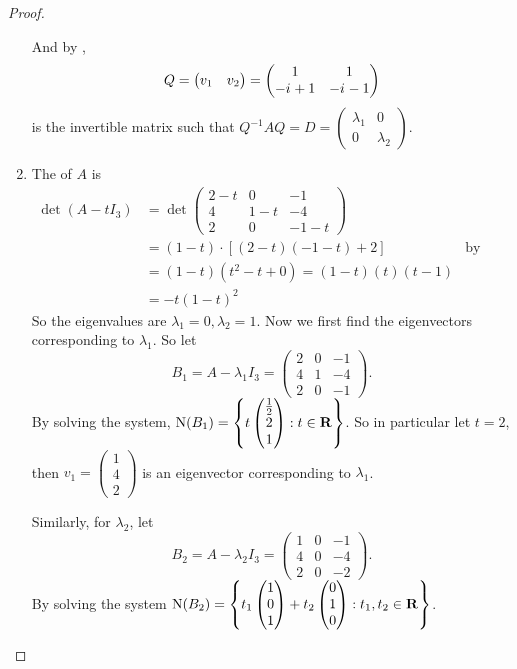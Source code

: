 \begin{proof}
\begin{enumerate}
And by ,
\[
    Q = \begin{pmatrix} v_1 & v_2 \end{pmatrix}
      = \begin{pmatrix}
            1        & 1 \\
            -{i\mkern1mu} + 1 & -{i\mkern1mu} - 1
        \end{pmatrix}
\]
is the invertible matrix such that \(Q^{-1} A Q = D = \begin{pmatrix}
    \lambda_1 & 0 \\ 0 & \lambda_2 \end{pmatrix}\).
    
\item The \CPOLY{} of \(A\) is
\begin{align*}
    \det(A - tI_3) & = \det \begin{pmatrix}
        2 - t & 0 & -1 \\ 4 & 1-t & -4 \\ 2 & 0 & -1 - t
    \end{pmatrix} \\
        & = (1 - t) \cdot [(2 - t)(-1 - t) + 2] & \text{by expanding second column} \\
        & = (1 - t) (t^2 - t + 0) = (1 - t)(t)(t - 1) \\
        & = -t(1 - t)^2
\end{align*}
So the eigenvalues are \(\lambda_1 = 0, \lambda_2 = 1\).
Now we first find the eigenvectors corresponding to \(\lambda_1\).
So let
\[
    B_1 = A - \lambda_1 I_3 = \begin{pmatrix}
        2 & 0 & -1 \\ 4 & 1 & -4 \\ 2 & 0 & -1
    \end{pmatrix}.
\]
By solving the system, \(\mathrm{N}(B_1) = \left\{ t \begin{pmatrix} \frac1{2} \\ 2 \\ 1 \end{pmatrix} : t \in \mathbf{R} \right\}\).
So in particular let \(t = 2\), then \(v_1 = \begin{pmatrix} 1 \\ 4 \\2 \end{pmatrix}\) is an eigenvector corresponding to \(\lambda_1\).

Similarly, for \(\lambda_2\), let
\[
    B_2 = A - \lambda_2 I_3 = \begin{pmatrix}
        1 & 0 & -1 \\ 4 & 0 & -4 \\ 2 & 0 & -2
    \end{pmatrix}.
\]
By solving the system \(\mathrm{N}(B_2) = \left\{ t_1 \begin{pmatrix} 1 \\ 0 \\ 1 \end{pmatrix} + t_2 \begin{pmatrix} 0 \\ 1 \\ 0 \end{pmatrix} : t_1, t_2 \in \mathbf{R} \right\}\).


\end{enumerate}
\end{proof}
